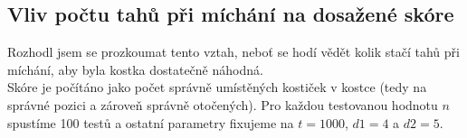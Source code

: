 \documentclass{article}
\begin{document}
\subsection*{Vliv počtu tahů při míchání na dosažené skóre}
Rozhodl jsem se prozkoumat tento vztah, neboť se hodí vědět kolik stačí tahů při míchání, aby byla kostka
dostatečně náhodná. \\
Skóre je počítáno jako počet správně umístěných kostiček v kostce (tedy na správné pozici a zároveň správně otočených).
Pro každou testovanou hodnotu $n$ spustíme 100 testů a ostatní parametry fixujeme na
$t = 1000$, $d1 = 4$ a $d2 = 5$.
\end{document}
